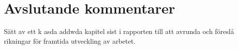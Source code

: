 \chapter{Avslutande kommentarer}\label{cha:conclusions}
%
Sätt av ett k asda  addwda kapitel sist i rapporten till att avrunda och föreslå rikningar för framtida utveckling av arbetet.
